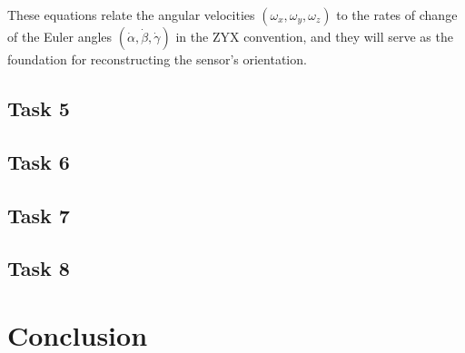 \documentclass[12pt]{article}
\begin{document}
These equations relate the angular velocities $(\omega_x, \omega_y, \omega_z)$ to the rates of change of the Euler angles $(\dot{\alpha}, \dot{\beta}, \dot{\gamma})$ in the ZYX convention, and they will serve as the foundation for reconstructing the sensor's orientation.


\subsection{Task 5}


\subsection{Task 6}


\subsection{Task 7}


\subsection{Task 8}

\section{Conclusion}






\appendix  
\clearpage
\addappheadtotoc 
\appendixpage 
\end{document}
